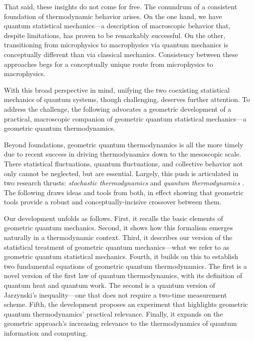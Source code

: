 \documentclass[draft,nofootinbib,pre,twocolumn,showpacs,showkeys,groupaddress,preprintnumbers,floatfix]{revtex4-1}
\newcommand{\1}{\mathbbm{1}}
\begin{document}
That said, these insights do not come for free. The conundrum of a consistent
foundation of thermodynamic behavior arises. On the one hand, we have quantum
statistical mechanics---a description of macroscopic behavior that, despite
limitations, has proven to be remarkably successful. On the other,
transitioning from microphysics to macrophysics via quantum mechanics is
conceptually different than via classical mechanics. Consistency between these
approaches begs for a conceptually unique route from microphysics to
macrophysics.

With this broad perspective in mind, unifying the two coexisting statistical
mechanics of quantum systems, though challenging, deserves further attention.
To address the challenge, the following advocates a geometric development of a
practical, macroscopic companion of geometric quantum statistical mechanics---a
{geometric quantum thermodynamics}.

Beyond foundations, geometric quantum thermodynamics is all the more timely due
to recent success in driving thermodynamics down to the mesoscopic scale. There
statistical fluctuations, quantum fluctuations, and collective behavior not
only cannot be neglected, but are essential. Largely, this push is articulated
in two research thrusts: \emph{stochastic thermodynamics}
\cite{Seifert2008,Seifert2012} and \emph{quantum thermodynamics}
\cite{Gemmer2004,Deffner2019}. The following draws ideas and tools from both,
in effect showing that geometric tools provide a robust and
conceptually-incisive crossover between them.

Our development unfolds as follows. First, it recalls the basic elements of
geometric quantum mechanics. Second, it shows how this formalism emerges
naturally in a thermodynamic context. Third, it describes our version of the
statistical treatment of geometric quantum mechanics---what we refer to as
geometric quantum statistical mechanics. Fourth, it builds on this to establish
two fundamental equations of geometric quantum thermodynamics. The first is a
novel version of the first law of quantum thermodynamics, with its definition
of quantum heat and quantum work. The second is a quantum version of
Jarzynski's inequality---one that does not require a two-time measurement
scheme. Fifth, the development proposes an experiment that highlights geometric
quantum thermodynamics' practical relevance. Finally, it expands on the
geometric approach's increasing relevance to the thermodynamics of quantum
information and computing.
\end{document}
